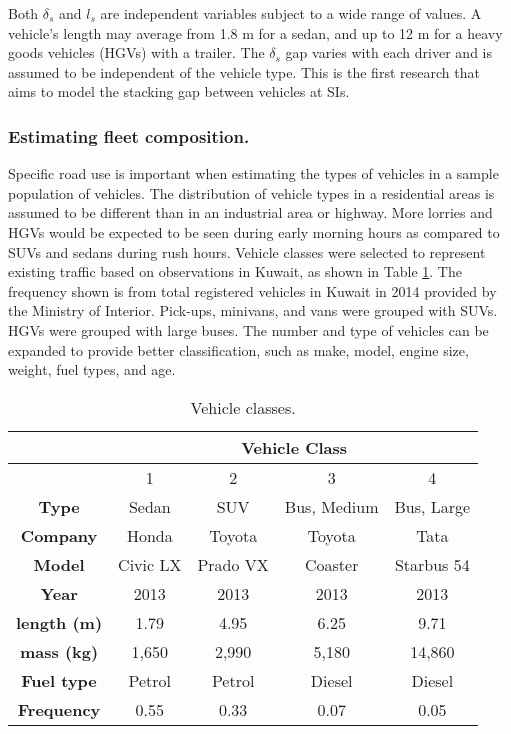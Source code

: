 Both $\delta_{s}$ and $l_{s}$ are independent variables subject to a wide range of values.  A vehicle's length may average from 1.8 m for a sedan, and up to 12 m for a heavy goods vehicles (HGVs) with a trailer. The $\delta_{s}$ gap varies with each driver and is assumed to be independent of the vehicle type. This is the first research that aims to model the stacking gap between vehicles at SIs.

\subsubsection{Estimating fleet composition.}
Specific road use is important when estimating the types of vehicles in a sample population of vehicles.  The distribution of vehicle types in a residential areas is assumed to be different than in an industrial area or highway. More lorries and HGVs would be expected to be seen during early morning hours as compared to SUVs and sedans during rush hours. Vehicle classes were selected to represent existing traffic based on observations in Kuwait, as shown in Table \ref{tb1:vehicletypes}. The frequency shown is from total registered vehicles in Kuwait in 2014 provided by the Ministry of Interior. Pick-ups, minivans, and vans were grouped with SUVs. HGVs were grouped with large buses. The number and type of vehicles can be expanded to provide better classification, such as make, model, engine size, weight, fuel types, and age.

\begin{table}[H]
\centering
\caption{Vehicle classes.}
\label{tb1:vehicletypes}
\begin{tabular}{@{}ccccc@{}}
\toprule
\multicolumn{1}{l}{} & \multicolumn{4}{c}{\textbf{Vehicle Class}}   \\ \midrule
\textbf{}            & 1        & 2        & 3           & 4          \\
\textbf{Type}        & Sedan    & SUV      & Bus, Medium & Bus, Large \\
\textbf{Company}     & Honda    & Toyota   & Toyota      & Tata       \\
\textbf{Model}       & Civic LX & Prado VX & Coaster     & Starbus 54 \\
\textbf{Year}        & 2013     & 2013     & 2013        & 2013       \\
\textbf{length (m)}  & 1.79     & 4.95     & 6.25        & 9.71       \\
\textbf{mass (kg)}   & 1,650    & 2,990    & 5,180       & 14,860     \\
\textbf{Fuel type}   & Petrol   & Petrol   & Diesel      & Diesel     \\
\textbf{Frequency}   & 0.55     & 0.33     & 0.07        & 0.05       \\ \bottomrule
\end{tabular}
\end{table}

